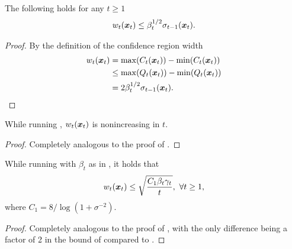 \begin{lemma}
\label{lem:iwb}
The following holds for any $t \geq 1$
\begin{align*}
w_t(\bm{x}_t) \leq \beta_t^{1/2}\sigma_{t-1}(\bm{x}_t).
\end{align*}
\end{lemma}
\begin{proof}
By the definition of the confidence region width
\begin{align*}
w_t(\bm{x}_t) &= \max(C_t(\bm{x}_t)) - \min(C_t(\bm{x}_t))\\
           &\leq \max(Q_t(\bm{x}_t)) - \min(Q_t(\bm{x}_t))\\
           &= 2\beta_t^{1/2}\sigma_{t-1}(\bm{x}_t).
\end{align*}
\end{proof}

\begin{lemma}
\label{lem:idec}
While running \iacl, $w_t(\bm{x}_t)$ is nonincreasing in $t$.
\end{lemma}
\begin{proof}
Completely analogous to the proof of .
\end{proof}

\begin{lemma}
\label{lem:iwbound}
While running \iacl with $\beta_t$ as in , it holds that
\begin{align*}
w_t(\bm{x}_t) \leq \sqrt{\frac{C_1 \beta_t \gamma_t}{t}},\ \forall t \geq 1,
\end{align*}
where $C_1 = 8 / \log(1 + \sigma^{-2})$.
\end{lemma}
\begin{proof}
Completely analogous to the proof of , with
the only difference being a factor of 2 in the bound
of  compared to .
\end{proof}

